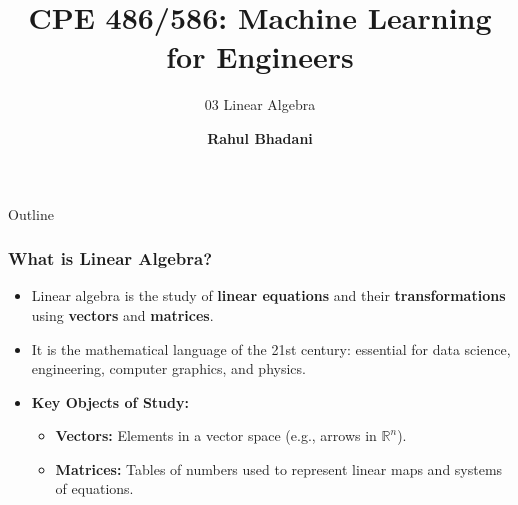 \documentclass[aspectratio=169,xcolor=dvipsnames,svgnames,x11names,fleqn]{beamer}
\title[CPE 486/586: Machine Learning]{CPE 486/586: Machine Learning for Engineers} %
\subtitle{03 Linear Algebra}
\author[Rahul Bhadani] {{\Large \textbf{Rahul Bhadani}}}
\institute[UAH] %
{
    Electrical \& Computer Engineering,  The University of Alabama in Huntsville
}
\date
\begin{document}
\begin{frame}
    \titlepage
\end{frame}

\begin{frame}{Outline}
    \backgroundtableofcontents
\end{frame}



\begin{frame}
\frametitle{What is Linear Algebra?}
\begin{itemize}
    \item Linear algebra is the study of \textbf{linear equations} and their \textbf{transformations} using \textbf{vectors} and \textbf{matrices}.
    \item It is the mathematical language of the 21st century: essential for data science, engineering, computer graphics, and physics.
    \item \textbf{Key Objects of Study:}
    \begin{itemize}
        \item \textbf{Vectors:} Elements in a vector space (e.g., arrows in $\mathbb{R}^n$).
        \item \textbf{Matrices:} Tables of numbers used to represent linear maps and systems of equations.
    \end{itemize}
\end{itemize}
\end{frame}
\end{document}
